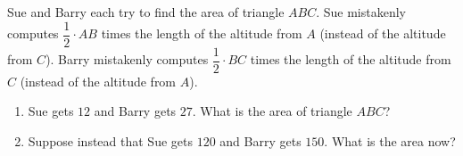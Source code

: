 Sue and Barry each try to find the area of triangle $ABC$. Sue mistakenly computes $\dfrac12\cdot AB$ times the length of the altitude from $A$ (instead of the altitude from $C$). Barry mistakenly computes $\dfrac12\cdot BC$ times the length of the altitude from $C$ (instead of the altitude from $A$).
\begin{enumerate}
\item[(a)] Sue gets $12$ and Barry gets $27$. What is the area of triangle $ABC$?
\item[(b)] Suppose instead that Sue gets $120$ and Barry gets $150$. What is the area now?
\end{enumerate}
